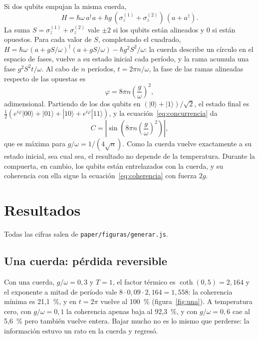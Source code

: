 \documentclass[11pt,a4paper]{article}
\begin{document}
Si dos qubits empujan la misma cuerda,
\begin{equation}\label{eq:hamB}
H = \hbar\omega\, a^\dagger a + \hbar g\,(\sigma_z^{(1)} + \sigma_z^{(2)})\,(a + a^\dagger).
\end{equation}
La suma $S = \sigma_z^{(1)} + \sigma_z^{(2)}$ vale $\pm 2$ si los qubits están alineados y 0 si están opuestos. Para cada valor de $S$, completando el cuadrado, $H = \hbar\omega\,(a + gS/\omega)^\dagger(a + gS/\omega) - \hbar g^2 S^2/\omega$: la cuerda describe un círculo en el espacio de fases, vuelve a su estado inicial cada período, y la rama acumula una fase $g^2S^2 t/\omega$. Al cabo de $n$ períodos, $t = 2\pi n/\omega$, la fase de las ramas alineadas respecto de las opuestas es
\begin{equation}\label{eq:fase}
\varphi = 8\pi n \left(\frac{g}{\omega}\right)^2 ,
\end{equation}
adimensional. Partiendo de los dos qubits en $(|0\rangle + |1\rangle)/\sqrt2$, el estado final es $\tfrac12(e^{i\varphi}|00\rangle + |01\rangle + |10\rangle + e^{i\varphi}|11\rangle)$, y la ecuación~\eqref{eq:concurrencia} da
\begin{equation}\label{eq:concB}
C = \left|\sin\!\left(8\pi n \left(\frac{g}{\omega}\right)^2\right)\right|,
\end{equation}
que es máxima para $g/\omega = 1/(4\sqrt n)$. Como la cuerda vuelve exactamente a su estado inicial, sea cual sea, el resultado no depende de la temperatura. Durante la compuerta, en cambio, los qubits están entrelazados con la cuerda, y su coherencia con ella sigue la ecuación~\eqref{eq:coherencia} con fuerza $2g$.

\section{Resultados}\label{sec:resultados}

Todas las cifras salen de \texttt{paper/figuras/generar.js}.

\subsection{Una cuerda: pérdida reversible}

Con una cuerda, $g/\omega = 0{,}3$ y $T = 1$, el factor térmico es $\coth(0{,}5) = 2{,}164$ y el exponente a mitad de período vale $8 \cdot 0{,}09 \cdot 2{,}164 = 1{,}558$: la coherencia mínima es 21,1~\%, y en $t = 2\pi$ vuelve al 100~\% (figura~\ref{fig:una}). A temperatura cero, con $g/\omega = 0{,}1$ la coherencia apenas baja al 92,3~\%, y con $g/\omega = 0{,}6$ cae al 5,6~\% pero también vuelve entera. Bajar mucho no es lo mismo que perderse: la información estuvo un rato en la cuerda y regresó.
\end{document}
